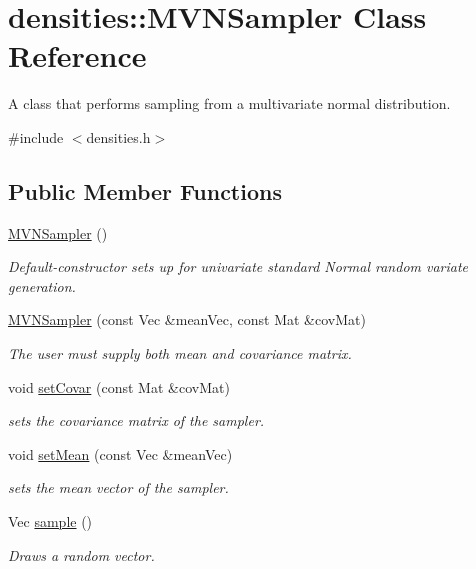 \hypertarget{classdensities_1_1MVNSampler}{}\section{densities\+:\+:M\+V\+N\+Sampler Class Reference}
\label{classdensities_1_1MVNSampler}


A class that performs sampling from a multivariate normal distribution.  




{\ttfamily \#include $<$densities.\+h$>$}

\subsection*{Public Member Functions}
\begin{DoxyCompactItemize}
\item 
\hyperlink{classdensities_1_1MVNSampler_abb1cac251d106e802ac99d70ae8a08fe}{M\+V\+N\+Sampler} ()\hypertarget{classdensities_1_1MVNSampler_abb1cac251d106e802ac99d70ae8a08fe}{}\label{classdensities_1_1MVNSampler_abb1cac251d106e802ac99d70ae8a08fe}

\begin{DoxyCompactList}\small\item\em Default-\/constructor sets up for univariate standard Normal random variate generation. \end{DoxyCompactList}\item 
\hyperlink{classdensities_1_1MVNSampler_ad4892d5a5018163f4b69974c4b80b4ea}{M\+V\+N\+Sampler} (const Vec \&mean\+Vec, const Mat \&cov\+Mat)
\begin{DoxyCompactList}\small\item\em The user must supply both mean and covariance matrix. \end{DoxyCompactList}\item 
void \hyperlink{classdensities_1_1MVNSampler_a914d6a896a1b7946085732a5758c16bb}{set\+Covar} (const Mat \&cov\+Mat)
\begin{DoxyCompactList}\small\item\em sets the covariance matrix of the sampler. \end{DoxyCompactList}\item 
void \hyperlink{classdensities_1_1MVNSampler_a456f1e8ed39efc34ee3a7667dfb2011c}{set\+Mean} (const Vec \&mean\+Vec)
\begin{DoxyCompactList}\small\item\em sets the mean vector of the sampler. \end{DoxyCompactList}\item 
Vec \hyperlink{classdensities_1_1MVNSampler_a6be29ab6518db1f6457e95469e6970a4}{sample} ()
\begin{DoxyCompactList}\small\item\em Draws a random vector. \end{DoxyCompactList}\end{DoxyCompactItemize}


